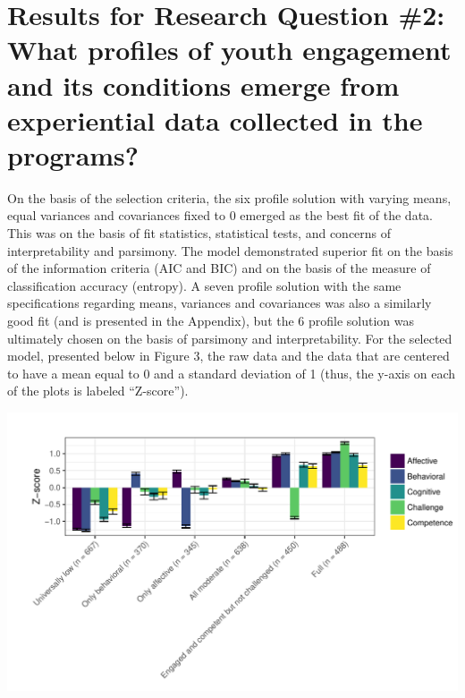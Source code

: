 \documentclass[]{book}
\theoremstyle{definition}
\theoremstyle{definition}
\theoremstyle{definition}
\theoremstyle{remark}
\begin{document}
\section{Results for Research Question \#2: What profiles of youth
engagement and its conditions emerge from experiential data collected in
the
programs?}\label{results-for-research-question-2-what-profiles-of-youth-engagement-and-its-conditions-emerge-from-experiential-data-collected-in-the-programs}

On the basis of the selection criteria, the six profile solution with
varying means, equal variances and covariances fixed to 0 emerged as the
best fit of the data. This was on the basis of fit statistics,
statistical tests, and concerns of interpretability and parsimony. The
model demonstrated superior fit on the basis of the information criteria
(AIC and BIC) and on the basis of the measure of classification accuracy
(entropy). A seven profile solution with the same specifications
regarding means, variances and covariances was also a similarly good fit
(and is presented in the Appendix), but the 6 profile solution was
ultimately chosen on the basis of parsimony and interpretability. For
the selected model, presented below in Figure 3, the raw data and the
data that are centered to have a mean equal to 0 and a standard
deviation of 1 (thus, the y-axis on each of the plots is labeled
``Z-score'').

\begin{center}\includegraphics[width=1\linewidth]{rosenberg-dissertation_files/figure-latex/unnamed-chunk-10-1} \end{center}
\end{document}
